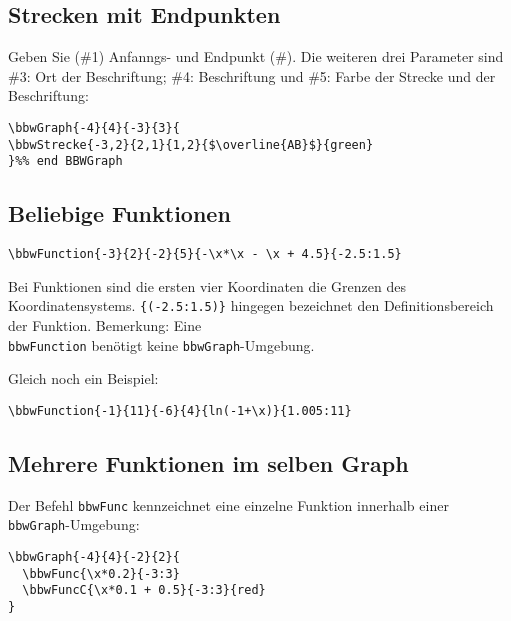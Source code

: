 \subsection{Strecken mit Endpunkten}
Geben Sie (\#1) Anfanngs- und Endpunkt (\#). Die weiteren drei Parameter sind
\#3: Ort der Beschriftung; \#4: Beschriftung und \#5: Farbe der Strecke
und der Beschriftung:


\begin{verbatim}
\bbwGraph{-4}{4}{-3}{3}{
\bbwStrecke{-3,2}{2,1}{1,2}{$\overline{AB}$}{green}
}%% end BBWGraph
\end{verbatim}

\newpage

\subsection{Beliebige Funktionen}
\begin{verbatim}
\bbwFunction{-3}{2}{-2}{5}{-\x*\x - \x + 4.5}{-2.5:1.5}
\end{verbatim}

Bei Funktionen sind die ersten vier Koordinaten die Grenzen des Koordinatensystems. \texttt{\{(-2.5:1.5)\}} hingegen bezeichnet den Definitionsbereich der Funktion.
Bemerkung: Eine \texttt{\\bbwFunction} benötigt
keine \texttt{bbwGraph}-Umgebung.
\newpage

Gleich noch ein Beispiel:

\begin{verbatim}
\bbwFunction{-1}{11}{-6}{4}{ln(-1+\x)}{1.005:11}
\end{verbatim}
\newpage


\subsection{Mehrere Funktionen im selben Graph}
Der Befehl \texttt{bbwFunc} kennzeichnet eine einzelne Funktion
innerhalb einer \texttt{bbwGraph}-Umgebung:

\begin{verbatim}
\bbwGraph{-4}{4}{-2}{2}{
  \bbwFunc{\x*0.2}{-3:3}
  \bbwFuncC{\x*0.1 + 0.5}{-3:3}{red}
}
\end{verbatim}


